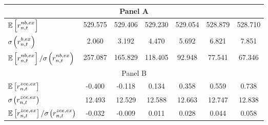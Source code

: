 \begin{table}[h!] \small
\captionsetup{font=small, width=0.8\textwidth}
\caption{} \label{tab:tab1} \vspace{0.25cm}
\centering
\def\arraystretch{1.1}
\begin{tabular}{l|cccccc}
\hline\hline
\multicolumn{7}{c}{Panel A} \\\hline\hline
$\mathbb{E}\left[r_{n,t}^{nb,ex}\right]$&529.575 &529.406 &529.230 &529.054 &528.879 &528.710 \\
$\sigma\hspace{-0.02cm}\left(r_{n,t}^{b,ex}\right)$&2.060 &3.192 &4.470 &5.692 &6.821 &7.851 \\
$\E\left[r_{n,t}^{nb,ex}\right]/\sigma\hspace{-0.02cm}\left(r_{n,t}^{nb,ex}\right)$&257.087 &165.829 &118.405 &92.948 &77.541 &67.346 \\
\hline\hline
\multicolumn{7}{c}{Panel B} \\\hline\hline
$\mathbb{E}\left[r_{n,t}^{zce,ex}\right]$&-0.400 &-0.118 &0.134 &0.358 &0.559 &0.738 \\
$\sigma\hspace{-0.02cm}\left(r_{n,t}^{zce,ex}\right)$&12.493 &12.529 &12.588 &12.663 &12.747 &12.838 \\
$\E\left[r_{n,t}^{zce,ex}\right]/\sigma\hspace{-0.02cm}\left(r_{n,t}^{zce,ex}\right)$&-0.032 &-0.009 &0.011 &0.028 &0.044 &0.058 \\
\hline
\hline
\end{tabular}
\end{table}
